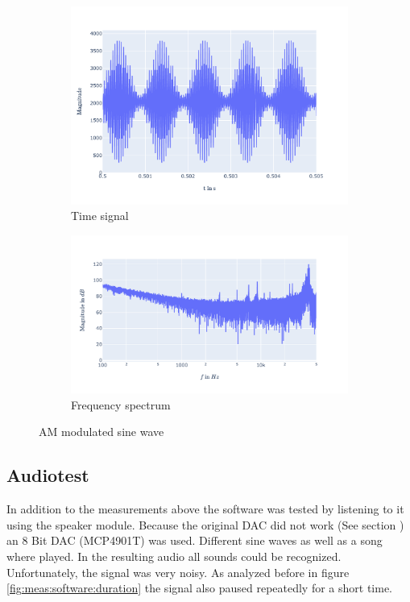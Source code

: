 \begin{figure}
  \centering
  \begin{subfigure}[b]{0.8\textwidth}
    \includegraphics[width=\textwidth]{src/assets/pictures/measurements/software_am_time.pdf}
    \caption{Time signal}
    \label{fig:meas:software:am_time}
  \end{subfigure}
  \hfill
  \begin{subfigure}[b]{0.8\textwidth}
    \includegraphics[width=\textwidth]{src/assets/pictures/measurements/software_am_frequency.pdf}
    \caption{Frequency spectrum}
    \label{fig:meas:software:am_freq}
  \end{subfigure}
  \caption{AM modulated sine wave}
  \label{fig:meas:software:am}
\end{figure}
%
\subsection{Audiotest}

In addition to the measurements above the software was tested by listening to it using the speaker module. Because the original DAC did not work (See section ) an 8 Bit DAC (MCP4901T) was used. Different sine waves as well as a song where played. In the resulting audio all sounds could be recognized. Unfortunately, the signal was very noisy. As analyzed before in figure \ref{fig:meas:software:duration} the signal also paused repeatedly for a short time.